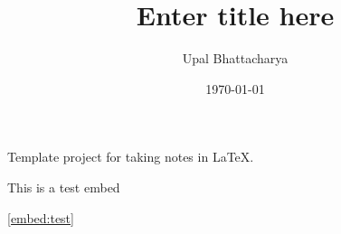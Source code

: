 \documentclass[a4paper,colorinlistoftodos]{article}
\author{Upal Bhattacharya}
\date{\today}
\title{Enter title here}
\begin{document}
\maketitle

\begingroup
    \hypersetup{linkcolor=black}
    \tableofcontents
    \pagebreak
\endgroup

\linenumbers

Template project for taking notes in \LaTeX.

\begin{scontents}[store-env=embed:test,print-env=true]
  \label{embed:test}
  This is a test embed
\end{scontents}

\newpage


\cref{embed:test}




\pagebreak
\nolinenumbers
\appendix

\begingroup
    \hypersetup{linkcolor=black}
    \listoftodos
    \listofchanges
    \pagebreak
\endgroup
\end{document}
